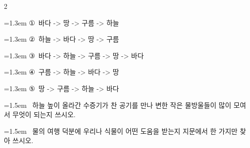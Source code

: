 \documentclass[12pt, a4paper]{article}
\begin{document}
\begin{multicols}{2}
\begin{minipage}{\columnwidth}
\vspace{0.5mm}
{\hangindent=1.3em  \noindent\hspace{0.3em}①~바다 -> 땅 -> 구름 -> 하늘\par}
{\hangindent=1.3em  \noindent\hspace{0.3em}②~하늘 -> 바다 -> 땅 -> 구름\par}
{\hangindent=1.3em  \noindent\hspace{0.3em}③~바다 -> 하늘 -> 구름 -> 땅 -> 바다\par}
{\hangindent=1.3em  \noindent\hspace{0.3em}④~구름 -> 하늘 -> 바다 -> 땅\par}
{\hangindent=1.3em  \noindent\hspace{0.3em}⑤~땅 -> 구름 -> 하늘 -> 바다\par}
\vspace{4mm}
\end{minipage}
\par

\noindent\begin{minipage}{\columnwidth}
\vspace{2mm}
{\hangindent=1.5em  ~하늘 높이 올라간 수증기가 찬 공기를 만나 변한 작은 물방울들이 많이 모여서 무엇이 되는지 쓰시오.\par}

\vspace{3mm}
\noindent\hrulefill
\vspace{2.5mm}
\noindent\hrulefill
\vspace{2.5mm}
\noindent\hrulefill
\vspace{2.5mm}
\noindent\hrulefill
\vspace{2.5mm}
\noindent\hrulefill
\vspace{2.5mm}
\vspace{1mm}
\vspace{4mm}
\end{minipage}
\par

\noindent\begin{minipage}{\columnwidth}
\vspace{2mm}
{\hangindent=1.5em  ~물의 여행 덕분에 우리나 식물이 어떤 도움을 받는지 지문에서 한 가지만 찾아 쓰시오.\par}

\vspace{3mm}
\noindent\hrulefill
\vspace{2.5mm}
\noindent\hrulefill
\vspace{2.5mm}
\noindent\hrulefill
\vspace{2.5mm}
\noindent\hrulefill
\vspace{2.5mm}
\noindent\hrulefill
\vspace{2.5mm}
\vspace{1mm}
\vspace{4mm}
\end{minipage}
\par



\end{multicols}
\end{document}
